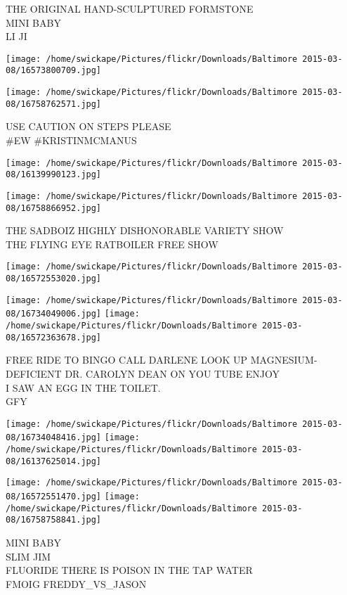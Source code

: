 \documentclass[10pt,letterpaper]{article}
\begin{document}
THE ORIGINAL HAND{-}SCULPTURED FORMSTONE\\
MINI BABY\\
LI JI
\pagebreak

\texttt{[image: /home/swickape/Pictures/flickr/Downloads/Baltimore 2015-03-08/16573800709.jpg]}

\vspace{0.25in}
\texttt{[image: /home/swickape/Pictures/flickr/Downloads/Baltimore 2015-03-08/16758762571.jpg]}

USE CAUTION ON STEPS PLEASE\\
\#EW \#KRISTINMCMANUS
\pagebreak

\texttt{[image: /home/swickape/Pictures/flickr/Downloads/Baltimore 2015-03-08/16139990123.jpg]}

\vspace{0.25in}
\texttt{[image: /home/swickape/Pictures/flickr/Downloads/Baltimore 2015-03-08/16758866952.jpg]}

THE SADBOIZ HIGHLY DISHONORABLE VARIETY SHOW\\
THE FLYING EYE RATBOILER FREE SHOW
\pagebreak

\texttt{[image: /home/swickape/Pictures/flickr/Downloads/Baltimore 2015-03-08/16572553020.jpg]}

\vspace{0.25in}
\texttt{[image: /home/swickape/Pictures/flickr/Downloads/Baltimore 2015-03-08/16734049006.jpg]}
\texttt{[image: /home/swickape/Pictures/flickr/Downloads/Baltimore 2015-03-08/16572363678.jpg]}

FREE RIDE TO BINGO CALL DARLENE LOOK UP MAGNESIUM{-}DEFICIENT DR. CAROLYN DEAN ON YOU TUBE ENJOY\\
I SAW AN EGG IN THE TOILET.\\
GFY
\pagebreak

\texttt{[image: /home/swickape/Pictures/flickr/Downloads/Baltimore 2015-03-08/16734048416.jpg]}
\texttt{[image: /home/swickape/Pictures/flickr/Downloads/Baltimore 2015-03-08/16137625014.jpg]}

\texttt{[image: /home/swickape/Pictures/flickr/Downloads/Baltimore 2015-03-08/16572551470.jpg]}
\texttt{[image: /home/swickape/Pictures/flickr/Downloads/Baltimore 2015-03-08/16758758841.jpg]}

MINI BABY\\
SLIM JIM\\
FLUORIDE THERE IS POISON IN THE TAP WATER\\
FMOIG FREDDY\_VS\_JASON
\pagebreak
\end{document}
